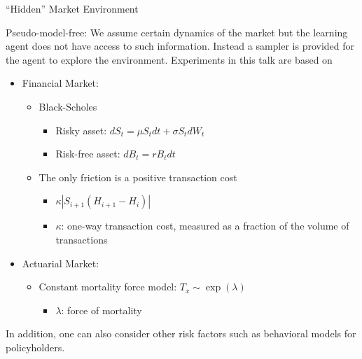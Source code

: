 \documentclass[10pt]{beamer}
\theoremstyle{definition}
\begin{document}
\begin{frame}{``Hidden'' Market Environment}

Pseudo-model-free: We assume certain dynamics of the market but the learning agent does not have access to such information. Instead a sampler is provided for the agent to explore the environment. Experiments in this talk are based on

\begin{itemize}
\item Financial Market:
    \begin{itemize}
        \item Black-Scholes
            \begin{itemize}
                    \item Risky asset: $dS_t = \mu S_tdt + \sigma S_t dW_t $
                    \item Risk-free asset: $dB_t = rB_tdt$
            \end{itemize}
        \item The only friction is a positive transaction cost
            \begin{itemize}
                    \item $ \kappa |S_{i+1} (H_{i+1} - H_{i})|$
                    \item $\kappa$: one-way transaction cost, measured as a fraction of the volume of transactions
            \end{itemize}
    \end{itemize}
\item Actuarial Market:
    \begin{itemize}
        \item Constant mortality force model: $T_x \sim \exp(\lambda)$
            \begin{itemize}
                \item $\lambda$: force of mortality
            \end{itemize}
    \end{itemize}
\end{itemize}

In addition, one can also consider other risk factors such as behavioral models for policyholders.

\end{frame}
\end{document}

